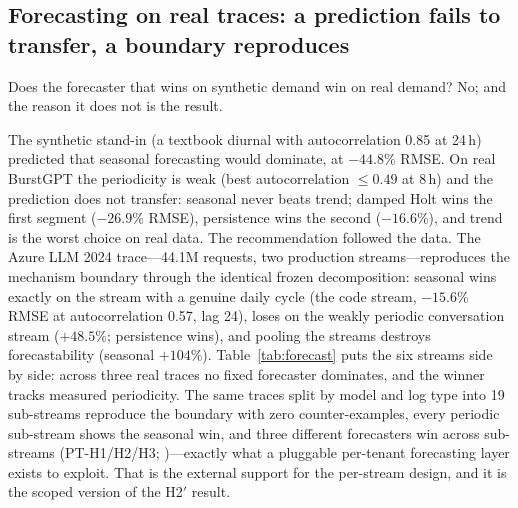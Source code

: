 \subsection{Forecasting on real traces: a prediction fails to transfer, a boundary reproduces}
\label{sec:eval-forecast}

Does the forecaster that wins on synthetic demand win on real demand? No;
and the reason it does not is the result.

The synthetic stand-in (a textbook diurnal with autocorrelation 0.85 at
24\,h) predicted that seasonal forecasting would dominate, at $-44.8\%$
RMSE. On real BurstGPT the periodicity is weak (best autocorrelation $\le
0.49$ at 8\,h) and the prediction does not transfer: seasonal never beats
trend; damped Holt wins the first segment ($-26.9\%$ RMSE), persistence
wins the second ($-16.6\%$), and trend is the worst choice on real data.
The recommendation followed the data. The Azure LLM 2024 trace---44.1M
requests, two production streams---reproduces the mechanism boundary
through the identical frozen decomposition: seasonal wins exactly on the
stream with a genuine daily cycle (the code stream, $-15.6\%$ RMSE at
autocorrelation 0.57, lag 24), loses on the weakly periodic conversation
stream ($+48.5\%$; persistence wins), and pooling the streams destroys
forecastability (seasonal $+104\%$). Table~\ref{tab:forecast} puts the
six streams side by side: across three real traces no fixed forecaster
dominates, and the winner tracks measured periodicity. The same traces
split by model and log type into 19 sub-streams reproduce the boundary
with zero counter-examples, every periodic sub-stream shows the seasonal
win, and three different forecasters win across sub-streams (PT-H1/H2/H3;
)---exactly what a pluggable per-tenant
forecasting layer exists to exploit. That is the external support for the
per-stream design, and it is the scoped version of the H2$'$ result.

